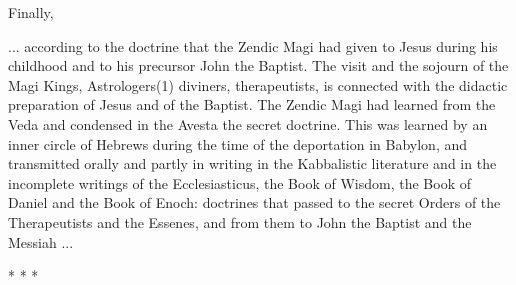 Finally,

\begin{quotex}
... according to the doctrine that the Zendic Magi had given to Jesus during his childhood and to his precursor John the Baptist. The visit and the sojourn of the Magi Kings, Astrologers(1) diviners, therapeutists, is connected with the didactic preparation of Jesus and of the Baptist. The Zendic Magi had learned from the Veda and condensed in the Avesta the secret doctrine. This was learned by an inner circle of Hebrews during the time of the deportation in Babylon, and transmitted orally and partly in writing in the Kabbalistic literature and in the incomplete writings of the Ecclesiasticus, the Book of Wisdom, the Book of Daniel and the Book of Enoch: doctrines that passed to the secret Orders of the Therapeutists and the Essenes, and from them to John the Baptist and the Messiah ... \end{quotex}




\begin{center}* * *\end{center}


